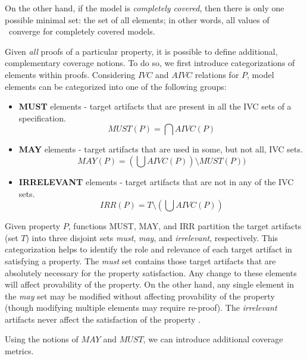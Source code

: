 \noindent On the other hand, if the model is {\em completely covered}, then there is only one possible minimal set: the set of all elements; in other words, all values of \ivccov\ converge for completely covered models.

Given {\em all} proofs of a particular property, it is possible to define additional, complementary coverage notions.  To do so, we first introduce categorizations of elements within proofs.
%
Considering $IVC$ and $AIVC$ relations for $P$, model elements can be categorized into one of the following groups:

\begin{itemize}
  \item \textbf{MUST} elements - target artifacts that are present in all the IVC sets of a specification.
      \[
      MUST (P) = \bigcap AIVC(P)
      \]

  \item \textbf{MAY} elements - target artifacts that are used in some, but not all, IVC sets.
      \[
      MAY(P) = (\bigcup AIVC (P)) \setminus MUST (P))
      \]

  \item \textbf{IRRELEVANT} elements - target artifacts that are not in any of the IVC sets.
  $$IRR(P) = T \setminus (\bigcup AIVC (P))$$
\end{itemize}

Given property $P$, functions MUST, MAY, and IRR partition the target artifacts (set $T$) into three disjoint sets \emph{must}, \emph{may}, and \emph{irrelevant}, respectively. This categorization helps to identify the role and relevance of each target artifact in satisfying a property. The \emph{must} set contains those target artifacts that are absolutely necessary for the property satisfaction.  Any change to these elements will affect provability of the property. On the other hand, any single element in the \emph{may} set may be modified without affecting provability of the property (though modifying multiple elements may require re-proof).   The \emph{irrelevant} artifacts never affect the satisfaction of the property \cite{Murugesan16:renext}.


Using the notions of $MAY$ and $MUST$, we can introduce additional coverage metrics.

